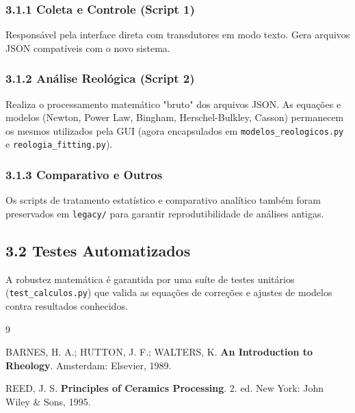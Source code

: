\documentclass[a4paper,12pt]{article}
\begin{document}
\subsubsection*{3.1.1 Coleta e Controle (Script 1)}
Responsável pela interface direta com transdutores em modo texto. Gera arquivos JSON compatíveis com o novo sistema.

\subsubsection*{3.1.2 Análise Reológica (Script 2)}
Realiza o processamento matemático "bruto" dos arquivos JSON. As equações e modelos (Newton, Power Law, Bingham, Herschel-Bulkley, Casson) permanecem os mesmos utilizados pela GUI (agora encapsulados em \texttt{modelos\_reologicos.py} e \texttt{reologia\_fitting.py}).

\subsubsection*{3.1.3 Comparativo e Outros}
Os scripts de tratamento estatístico e comparativo analítico também foram preservados em \texttt{legacy/} para garantir reprodutibilidade de análises antigas.

\subsection*{3.2 Testes Automatizados}
A robustez matemática é garantida por uma suíte de testes unitários (\texttt{test\_calculos.py}) que valida as equações de correções e ajustes de modelos contra resultados conhecidos.

\begin{thebibliography}{9}

BARNES, H. A.; HUTTON, J. F.; WALTERS, K. \textbf{An Introduction to Rheology}. Amsterdam: Elsevier, 1989.

REED, J. S. \textbf{Principles of Ceramics Processing}. 2. ed. New York: John Wiley \& Sons, 1995.

\end{thebibliography}
\end{document}
